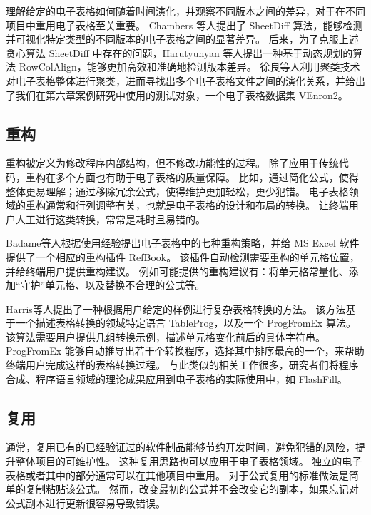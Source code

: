 理解给定的电子表格如何随着时间演化，并观察不同版本之间的差异，对于在不同项目中重用电子表格至关重要。
Chambers 等人\cite{chambers2010sheetdiff}提出了 SheetDiff 算法，能够检测并可视化特定类型的不同版本的电子表格之间的显著差异。
后来，为了克服上述贪心算法 SheetDiff 中存在的问题，Harutyunyan 等人\cite{harutyunyan2012planted}提出一种基于动态规划的算法 RowColAlign，能够更加高效和准确地检测版本差异。
徐良等人\cite{xu2017spreadcluster}利用聚类技术对电子表格整体进行聚类，进而寻找出多个电子表格文件之间的演化关系，并给出了我们在第六章案例研究中使用的测试对象，一个电子表格数据集 VEnron2。

\subsection{重构}
重构被定义为修改程序内部结构，但不修改功能性的过程\cite{o2010spreadsheet}。
除了应用于传统代码，重构在多个方面也有助于电子表格的质量保障。
比如，通过简化公式，使得整体更易理解；通过移除冗余公式，使得维护更加轻松，更少犯错。
电子表格领域的重构通常和行列调整有关，也就是电子表格的设计和布局的转换。
让终端用户人工进行这类转换，常常是耗时且易错的。

Badame等人\cite{badame2012refactoring}根据使用经验提出电子表格中的七种重构策略，并给 MS Excel 软件提供了一个相应的重构插件 RefBook。
该插件自动检测需要重构的单元格位置，并给终端用户提供重构建议。
例如可能提供的重构建议有：将单元格常量化、添加“守护”单元格、以及替换不合理的公式等。

Harris等人\cite{harris2011spreadsheet}提出了一种根据用户给定的样例进行复杂表格转换的方法。
该方法基于一个描述表格转换的领域特定语言 TableProg，以及一个 ProgFromEx 算法。
该算法需要用户提供几组转换示例，描述单元格变化前后的具体字符串。
ProgFromEx 能够自动推导出若干个转换程序，选择其中排序最高的一个，来帮助终端用户完成这样的表格转换过程。
与此类似的相关工作很多，研究者们将程序合成、程序语言领域的理论成果应用到电子表格的实际使用中，如 FlashFill\cite{singh2016transforming}。

\subsection{复用}
通常，复用已有的已经验证过的软件制品能够节约开发时间，避免犯错的风险，提升整体项目的可维护性\cite{ye2005reuse}。
这种复用思路也可以应用于电子表格领域。
独立的电子表格或者其中的部分通常可以在其他项目中重用。
对于公式复用的标准做法是简单的复制粘贴该公式。
然而，改变最初的公式并不会改变它的副本，如果忘记对公式副本进行更新很容易导致错误。

